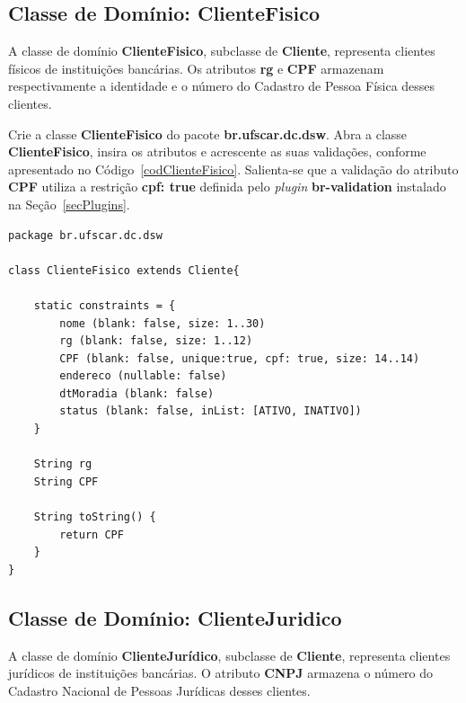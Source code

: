 \newpage

\subsection{Classe de Domínio: ClienteFisico}\label{secClienteFisico}

\vspace{0.5cm}

A classe de domínio {\bf  ClienteFisico}, subclasse de {\bf Cliente}, representa
clientes físicos  de instituições bancárias. Os  atributos {\bf rg}  e {\bf CPF}
armazenam respectivamente a  identidade e o número do  Cadastro de Pessoa Física
desses clientes.  

\vspace{0.2cm}

Crie  a classe  {\bf ClienteFisico}  do pacote  {\bf br.ufscar.dc.dsw}.   Abra a
classe {\bf ClienteFisico}, insira os atributos e acrescente as suas validações,
conforme  apresentado   no  Código~\ref{codClienteFisico}.  Salienta-se   que  a
validação do  atributo {\bf  CPF} utiliza a  restrição {\bf cpf:  true} definida
pelo {\it plugin} {\bf br-validation} instalado na Seção~\ref{secPlugins}. 

\begin{lstlisting}[caption=Classe de domínio  {\bf ClienteFisico}, frame = trBL,
    float=htbp, label=codClienteFisico] 
package br.ufscar.dc.dsw

class ClienteFisico extends Cliente{
    
    static constraints = {
        nome (blank: false, size: 1..30)
        rg (blank: false, size: 1..12)
        CPF (blank: false, unique:true, cpf: true, size: 14..14)
        endereco (nullable: false)
        dtMoradia (blank: false)
        status (blank: false, inList: [ATIVO, INATIVO])
    }
    
    String rg    
    String CPF
    
    String toString() {
        return CPF
    }
}
\end{lstlisting}

\subsection{Classe de Domínio: ClienteJuridico}\label{secClienteJuridico}

\vspace{0.5cm}

A  classe  de  domínio   {\bf  ClienteJurídico},  subclasse  de  {\bf  Cliente},
representa clientes  jurídicos de instituições bancárias. O  atributo {\bf CNPJ}
armazena o número do Cadastro Nacional de Pessoas Jurídicas desses clientes. 

